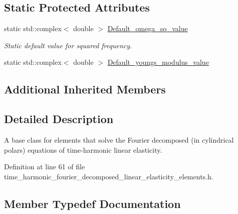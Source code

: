 \subsection*{Static Protected Attributes}
\begin{DoxyCompactItemize}
\item 
static std\+::complex$<$ double $>$ \hyperlink{classoomph_1_1TimeHarmonicFourierDecomposedLinearElasticityEquationsBase_a436fd6a15ccf402b5a645bfb2e889be4}{Default\+\_\+omega\+\_\+sq\+\_\+value}
\begin{DoxyCompactList}\small\item\em Static default value for squared frequency. \end{DoxyCompactList}\item 
static std\+::complex$<$ double $>$ \hyperlink{classoomph_1_1TimeHarmonicFourierDecomposedLinearElasticityEquationsBase_a3c4db38ac630e9db8d87ca33a0655e5b}{Default\+\_\+youngs\+\_\+modulus\+\_\+value}
\end{DoxyCompactItemize}
\subsection*{Additional Inherited Members}


\subsection{Detailed Description}
A base class for elements that solve the Fourier decomposed (in cylindrical polars) equations of time-\/harmonic linear elasticity. 

Definition at line 61 of file time\+\_\+harmonic\+\_\+fourier\+\_\+decomposed\+\_\+linear\+\_\+elasticity\+\_\+elements.\+h.



\subsection{Member Typedef Documentation}
\mbox{\label{classoomph_1_1TimeHarmonicFourierDecomposedLinearElasticityEquationsBase_ac582edc989cd98af8a03f5bf58d7a05a}} 
